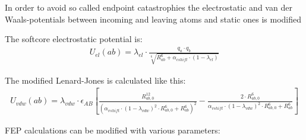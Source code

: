 \documentclass[10pt,a4paper]{article} %
\begin{document}
	In order to avoid so called endpoint catastrophies the electrostatic and van der Waals-potentials between incoming and leaving atoms and static ones is modified \supercite{chipot_free_2007}
	
	The softcore electrostatic potential is:\supercite{becker_development_2015}
	\begin{align}
U_{el}(ab) = \lambda_{el} \cdot \frac{q_a \cdot q_b}{\sqrt[6]{R_{ab}^6 + \alpha_{cshift} \cdot (1-\lambda_{el})}} \label{cb_softcore}
\end{align}

The modified Lenard-Jones is calculated like this:\supercite{beutler_avoiding_1994}
\begin{align}
U_{vdw}(ab) = \lambda_{vdw} \cdot \epsilon_{AB} \left[ \frac{R_{ab,0}^{12}}{\left(\alpha_{vshift} \cdot (1-\lambda_{vdw})^2 \cdot R_{ab,0}^6 + R_{ab}^6 \right)^2}  -  \frac{2 \cdot R_{ab,0}^6}{\alpha_{vshift} \cdot (1-\lambda_{vdw})^2 \cdot R_{ab,0}^6 + R_{ab}^6}  \right] \label{LJ_softcore}
\end{align}
	
	
	\ac{FEP} calculations can be modified with various parameters:
\end{document}
